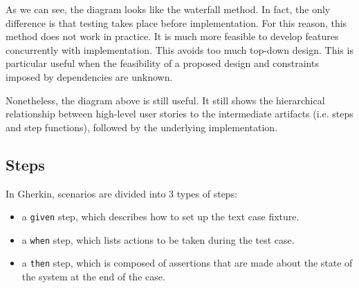 \documentclass[a4paper, openany]{memoir}
\begin{document}
As we can see, the diagram looks like the waterfall method. In fact, the only difference is that testing takes place before implementation. For this reason, this method does not work in practice. It is much more feasible to develop features concurrently with implementation. This avoids too much top-down design. This is particular useful when the feasibility of a proposed design and constraints imposed by dependencies are unknown. 

Nonetheless, the diagram above is still useful. It still shows the hierarchical relationship between high-level user stories to the intermediate artifacts (i.e. steps and step functions), followed by the underlying implementation.

\subsection{Steps}
In Gherkin, scenarios are divided into 3 types of steps:
\begin{itemize}
    \item a \texttt{given} step, which describes how to set up the text case fixture.
    \item a \texttt{when} step, which lists actions to be taken during the test case.
    \item a \texttt{then} step, which is composed of assertions that are made about the state of the system at the end of the case.
\end{itemize}
\end{document}
